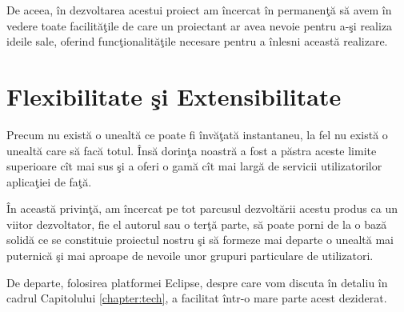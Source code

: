 De aceea, în dezvoltarea acestui proiect am încercat în permanenţă să avem în
vedere toate facilităţile de care un proiectant ar avea nevoie pentru a-şi
realiza ideile sale, oferind funcţionalităţile necesare pentru a înlesni această
realizare.

\section*{Flexibilitate şi Extensibilitate}

Precum nu există o unealtă ce poate fi învăţată instantaneu, la fel nu există o
unealtă care să facă totul. Însă dorinţa noastră a fost a păstra aceste limite
superioare cît mai sus şi a oferi o gamă cît mai largă de servicii
utilizatorilor aplicaţiei de faţă.

În această privinţă, am încercat pe tot parcusul dezvoltării acestu produs ca un
viitor dezvoltator, fie el autorul sau o terţă parte, să poate porni de la o
bază solidă ce se constituie proiectul nostru şi să formeze mai departe o
unealtă mai puternică şi mai aproape de nevoile unor grupuri particulare de
utilizatori.

De departe, folosirea platformei Eclipse, despre care vom discuta în detaliu în 
cadrul Capitolului \ref{chapter:tech}, a facilitat într-o mare parte acest 
deziderat.